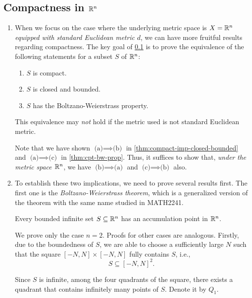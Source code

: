 \subsection{Compactness in \(\mathbb{R}^n\)}
\label{subsect:compactness-rn}
\begin{enumerate}
\item When we focus on the case where the underlying metric space is \(X=\mathbb{R}^n\)
\emph{equipped with standard Euclidean metric \(d\)}, we can have more fruitful
results regarding compactness. The key goal of \cref{subsect:compactness-rn} is
to prove the equivalence of the following statements for a subset \(S\) of
\(\mathbb{R}^n\):
\begin{enumerate}
\item \(S\) is compact.
\item \(S\) is closed and bounded.
\item \(S\) has the Boltzano-Weierstrass property.
\end{enumerate}
\begin{warning}
This equivalence may \emph{not} hold if the metric used is not standard
Euclidean metric.
\end{warning}

Note that we have shown \(\text{(a)}\implies \text{(b)}\) in
\cref{thm:compact-imp-closed-bounded} and \(\text{(a)}\implies \text{(c)}\) in
\cref{thm:cpt-bw-prop}. Thus, it suffices to show that, \emph{under the metric
space \(\mathbb{R}^n\)}, we have \(\text{(b)}\implies \text{(a)}\) and
\(\text{(c)}\implies \text{(b)}\) also.

\item To establish these two implications, we need to prove several results
first. The first one is the \emph{Boltzano-Weierstrass theorem}, which is a
generalized version of the theorem with the same name studied in MATH2241.

\begin{theorem}
\label{thm:boltzano-weierstrass}
Every bounded infinite set \(S\subseteq \mathbb{R}^n\) has an accumulation point in
\(\mathbb{R}^n\).
\end{theorem}
\begin{pf}
We prove only the case \(n=2\). Proofs for other cases are analogous. Firstly,
due to the boundedness of \(S\), we are able to choose a sufficiently large
\(N\) such that the square \([-N,N]\times [-N,N]\) fully contains \(S\), i.e.,
\[
S\subseteq [-N,N]^{2}.
\]
\begin{center}
\end{center}
Since \(S\) is infinite, among the four quadrants of the square, there exists
a quadrant that contains infinitely many points of \(S\). Denote it by \(Q_1\).


\end{pf}
\end{enumerate}
